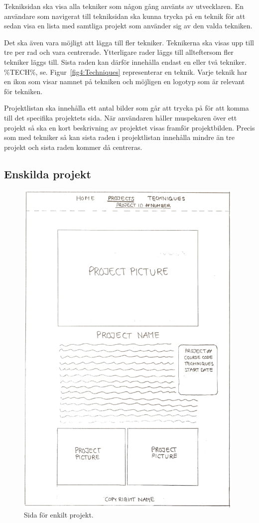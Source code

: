 \documentclass{TDP003mall}
\begin{document}
Tekniksidan ska visa alla tekniker som någon gång använts av utvecklaren.
En användare som navigerat till tekniksidan ska kunna trycka på en teknik för att sedan visa en lista med samtliga projekt som använder sig av den valda tekniken.

Det ska även vara möjligt att lägga till fler tekniker. Teknikerna ska visas upp till tre per rad och vara centrerade.
Ytterligare rader läggs till allteftersom fler tekniker läggs till. Sista raden kan därför innehålla endast en eller två tekniker.
\%TECH\%, se. Figur~\ref{fig4:Techniques} representerar en teknik. Varje teknik har en ikon som visar namnet på tekniken och möjligen en logotyp som är relevant för tekniken.

Projektlistan ska innehålla ett antal bilder som går att trycka på för att komma till det specifika projektets sida.
När användaren håller muspekaren över ett projekt så ska en kort beskrivning av projektet visas framför projektbilden.
Precis som med tekniker så kan sista raden i projektlistan innehålla mindre än tre projekt och sista raden kommer då centreras.

\pagebreak
\subsection{Enskilda projekt} \label{EnskildaProjekt}

\begin{figure}[ht!]
  \centering
  \includegraphics[width=110mm]{4_projectID.jpg}
  \caption{Sida för enkilt projekt.} \label{fig5:ProjectID}
\end{figure}
\end{document}
